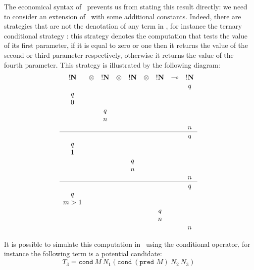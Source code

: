 The economical syntax of \pcf\ prevents us from stating this result
directly: we need to consider an extension of \pcf\ with some
additional constants. Indeed, there are strategies that are not the
denotation of any term in \pcf, for instance the ternary conditional
strategy : this strategy denotes the computation that tests the
value of its first parameter, if it is equal to zero or one then it
returns the value of the second or third parameter respectively,
otherwise it returns the value of the fourth parameter. This
strategy is illustrated by the following diagram:
$$
\begin{array}{ccccccccc}
!\bf N & \otimes & !\bf N & \otimes & !\bf N & \otimes & !\bf N & \multimap & !\bf N \\
&&&&&&&&q \\
q \\
0 \\
&& q \\
&& n \\
&&&&&&&&n \\
\hline
&&&&&&&&q \\
q \\
1 \\
&&&& q \\
&&&& n \\
&&&&&&&&n \\
\hline
&&&&&&&&q \\
q \\
m>1 \\
&&&&&& q \\
&&&&&& n \\
&&&&&&&&n \\
\end{array}
$$

It is possible to simulate this computation in \pcf\ using the conditional operator, for instance the following term is a potential candidate:
$$ T_3 = \texttt{cond}\ M\  N_1 (\texttt{cond}\  (\texttt{pred } M)\  N_2\  N_3)$$

